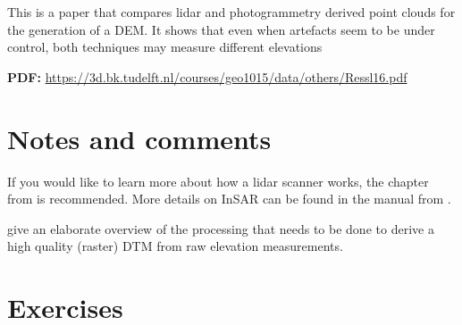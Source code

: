 
\begin{floatbox}
	\begin{kaobox-toread}[frametitle=\faExternalLink\ To read or to watch]
	This is a paper that compares lidar and photogrammetry derived point clouds for the generation of a DEM\@. It shows that even when artefacts seem to be under control, both techniques may measure different elevations 

	\textbf{PDF:} \url{https://3d.bk.tudelft.nl/courses/geo1015/data/others/Ressl16.pdf}
	\end{kaobox-toread}
\end{floatbox}







%
\section{Notes and comments}
If you would like to learn more about how a lidar scanner works, the chapter from \citet{Chazette16} is recommended.
More details on InSAR can be found in the manual from \citet{ESA07}.

\citet{Reuter09} give an elaborate overview of the processing that needs to be done to derive a high quality (raster) DTM from raw elevation measurements.


%
\section{Exercises}

